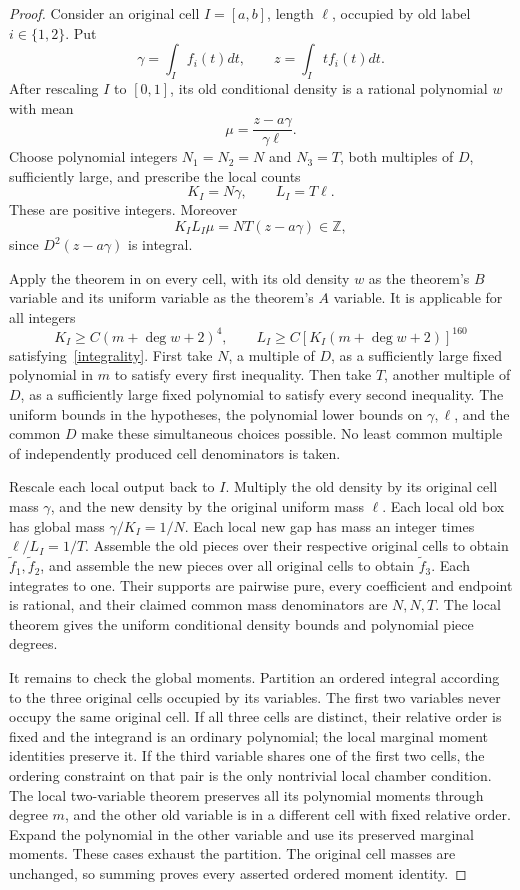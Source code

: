 \documentclass[11pt]{article}
\begin{document}
\begin{proof}
Consider an original cell $I=[a,b]$, length $\ell$, occupied by old
label $i\in\{1,2\}$. Put
\[
 \gamma=\int_I f_i(t)dt,\qquad z=\int_I t f_i(t)dt.
\]
After rescaling $I$ to $[0,1]$, its old conditional density is a rational
polynomial $w$ with mean
\[
 \mu=\frac{z-a\gamma}{\gamma\ell}.
\]
Choose polynomial integers $N_1=N_2=N$ and $N_3=T$, both multiples
of $D$, sufficiently large, and prescribe the local counts
\[
 K_I=N\gamma,\qquad L_I=T\ell.
\]
These are positive integers. Moreover
\begin{equation}\label{integrality}
 K_I L_I\mu=NT(z-a\gamma)\in\mathbb Z,
\end{equation}
since $D^2(z-a\gamma)$ is integral.

Apply the theorem in
on every cell, with its old density $w$ as the theorem's $B$ variable
and its uniform variable as the theorem's $A$ variable. It is applicable
for all integers
\[
 K_I\ge C(m+\deg w+2)^4,\qquad
 L_I\ge C[K_I(m+\deg w+2)]^{160}
\]
satisfying~\eqref{integrality}. First take $N$, a multiple of $D$,
as a sufficiently large fixed polynomial in $m$ to satisfy every
first inequality. Then take $T$, another multiple of $D$, as a
sufficiently large fixed polynomial to satisfy every second inequality.
The uniform bounds in the hypotheses, the polynomial lower bounds on
$\gamma,\ell$, and the common $D$ make these simultaneous choices
possible. No least common multiple of independently produced cell
denominators is taken.

Rescale each local output back to $I$. Multiply the old density by its
original cell mass $\gamma$, and the new density by the original
uniform mass $\ell$. Each local old box has global mass
$\gamma/K_I=1/N$. Each local new gap has mass an integer times
$\ell/L_I=1/T$. Assemble the old pieces over their respective original
cells to obtain $\widetilde f_1,\widetilde f_2$, and assemble the new
pieces over all original cells to obtain $\widetilde f_3$.
Each integrates to one. Their supports are pairwise pure, every
coefficient and endpoint is rational, and their claimed common mass
denominators are $N,N,T$. The local theorem gives the uniform
conditional density bounds and polynomial piece degrees.

It remains to check the global moments. Partition an ordered integral
according to the three original cells occupied by its variables.
The first two variables never occupy the same original cell.
If all three cells are distinct, their relative order is fixed and
the integrand is an ordinary polynomial; the local marginal moment
identities preserve it. If the third variable shares one of the first
two cells, the ordering constraint on that pair is the only nontrivial
local chamber condition. The local two-variable theorem preserves
all its polynomial moments through degree $m$, and the other old
variable is in a different cell with fixed relative order. Expand
the polynomial in the other variable and use its preserved marginal
moments. These cases exhaust the partition. The original cell masses
are unchanged, so summing proves every asserted ordered moment identity.
\end{proof}
\end{document}
